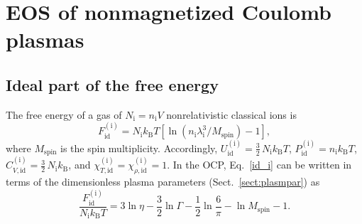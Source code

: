 \documentclass[traditabstract]{aa}
\newcommand{\beq}{\begin{equation}}
\newcommand{\eeq}{\end{equation}}
\newcommand{\req}[1]{Eq.~\ref{#1}}
\newcommand{\lambdi}{\lambda_\mathrm{i}}
\newcommand{\Mspin}{M_\mathrm{spin}}
\newcommand{\nion}{n_\mathrm{i}}
\newcommand{\Nion}{N_\mathrm{i}}
\newcommand{\kB}{k_\mathrm{B}}
\begin{document}
\section{EOS of nonmagnetized Coulomb plasmas}
\label{sect:nonmag}

\subsection{Ideal part of the free energy}
\label{sect:id}

The free energy of a gas of
$\Nion=\nion V$ nonrelativistic classical ions is
\beq
   F_\mathrm{id}^\mathrm{(i)} =
     \Nion \kB T \left[\ln(\nion\lambdi^3/\Mspin)-1 \right],
\label{id_i}
\end{equation}
where $\Mspin$ is the spin multiplicity. Accordingly,
$U_\mathrm{id}^\mathrm{(i)} =\frac32\, \Nion \kB T$,
$P_\mathrm{id}^\mathrm{(i)} =\nion \kB T$,
$C_{V,\mathrm{id}}^\mathrm{(i)} =\frac32\, \Nion \kB$, and
$\chi_{T,\mathrm{id}}^\mathrm{(i)}=
\chi_{\rho,\mathrm{id}}^\mathrm{(i)}=1$.
In the OCP, \req{id_i} can be written in terms of the
dimensionless plasma parameters (Sect.~\ref{sect:plasmpar}) as
\beq
   \frac{F_\mathrm{id}^\mathrm{(i)}}{\Nion\kB T}
      = 3 \ln \eta - \frac32 \ln \Gamma
        - \frac12 \ln\frac6\pi-\ln \Mspin -1.
\eeq
\end{document}
